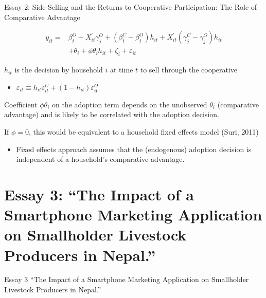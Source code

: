 \documentclass[aspectratio=169]{beamer}
\newenvironment{wideitemize}{\itemize\addtolength{\itemsep}{10pt}}{\enditemize}
\begin{document}
\begin{frame}{Essay 2: Side-Selling and the Returns to Cooperative Participation: The Role of Comparative Advantage}

\begin{equation} \label{eq:E2_spec}
    \begin{split}
    y_{it} = & \beta^{O}_{t} + X^{\prime}_{it}\gamma^{O}_{j} + (\beta^{C}_{t} - \beta^{O}_{t})h_{it} +  X^{\prime}_{it}(\gamma^{C}_{j} - \gamma^{O}_{j})h_{it} \\
    & + \theta_{i} + \phi\theta_{i}h_{it} + \zeta_i + \varepsilon_{it}
    \end{split}
\end{equation}

\begin{wideitemize}
    \item $h_{it}$ is the decision by household $i$ at time $t$ to sell through the cooperative
        \begin{itemize}
            \item $\varepsilon_{it} \equiv h_{it}\varepsilon^{C}_{it} + (1-h_{it})\varepsilon^{O}_{it}$
        \end{itemize}
    \item Coefficient $\phi\theta_{i}$ on the adoption term depends on the unobserved $\theta_{i}$ (comparative advantage) and is likely to be correlated with the adoption decision. 
    \item If $\phi = 0$, this would be equivalent to a household fixed effects model (Suri, 2011)
        \begin{itemize}
            \item Fixed effects approach assumes that the (endogenous) adoption decision is independent of a household’s comparative advantage.
        \end{itemize}
\end{wideitemize}
\end{frame}

\section{Essay 3: ``The Impact of a Smartphone Marketing Application on Smallholder Livestock Producers in Nepal.''}

\begin{frame}{Essay 3}
\centering
\Large{``The Impact of a Smartphone Marketing Application on Smallholder Livestock Producers in Nepal.''}
\end{frame}
\end{document}
